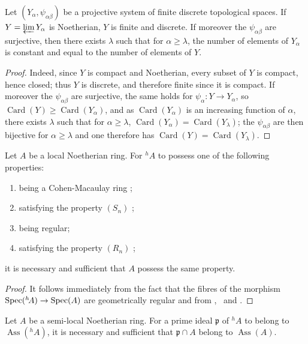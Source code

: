 \begin{lemma}[18.6.9.2]
\label{IV.18.6.9.2}
Let $(Y_\alpha,\psi_{\alpha\beta})$ be a projective system of finite discrete topological spaces.
If $Y=\varprojlim Y_\alpha$ is Noetherian, $Y$ is finite and discrete.
If moreover the $\psi_{\alpha\beta}$ are surjective, then there exists $\lambda$ such that for $\alpha\geq\lambda$, the number of elements of $Y_\alpha$ is constant and equal to the number of elements of $Y$.
\end{lemma}

\begin{proof}
Indeed, since $Y$ is compact and Noetherian, every subset of $Y$ is compact, hence closed; thus $Y$ is discrete, and therefore finite since it is compact.
If moreover the $\psi_{\alpha\beta}$ are surjective, the same holds for $\psi_\alpha:Y\to Y_\alpha$, so $\operatorname{Card}(Y)\geq\operatorname{Card}(Y_\alpha)$, and as $\operatorname{Card}(Y_\alpha)$ is an increasing function of $\alpha$, there exists $\lambda$ such that for $\alpha\geq\lambda$, $\operatorname{Card}(Y_\alpha)=\operatorname{Card}(Y_\lambda)$;
the $\psi_{\alpha\beta}$ are then bijective for $\alpha\geq\lambda$ and one therefore has $\operatorname{Card}(Y)=\operatorname{Card}(Y_\lambda)$.
\end{proof}

\begin{corollary}[18.6.10]
\label{IV.18.6.10}
Let $A$ be a local Noetherian ring.
For ${}^h\!A$ to possess one of the following properties:
\begin{enumerate}[label=\emph{\alph*)}]
  \item being a Cohen-Macaulay ring ;
  \item satisfying the property $(S_n)$ ;
  \item being regular;
  \item satisfying the property $(R_n)$ ;
\end{enumerate}
it is necessary and sufficient that $A$ possess the same property.
\end{corollary}

\begin{proof}
It follows immediately from the fact that the fibres of the morphism $\operatorname{Spec}({}^h\!A)\to\operatorname{Spec}(A)$ are geometrically regular  and from ,~ and .
\end{proof}

\begin{corollary}[18.6.11]
\label{IV.18.6.11}
Let $A$ be a semi-local Noetherian ring.
For a prime ideal $\mathfrak{p}$ of ${}^h\!A$ to belong to $\operatorname{Ass}({}^h\!A)$, it is necessary and sufficient that $\mathfrak{p}\cap A$ belong to $\operatorname{Ass}(A)$.
\end{corollary}

